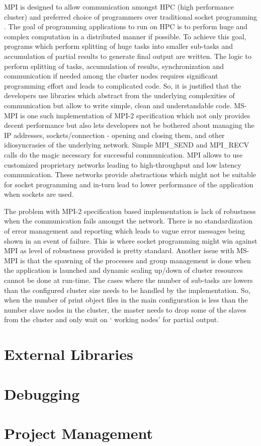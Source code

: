 MPI is designed to allow communication amongst HPC (high performance cluster) and preferred choice of programmers over traditional socket programming \cite{mpivssock}. The goal of programming applications to run on HPC is to perform huge and complex computation in a distributed manner if possible. To achieve this goal, programs which perform splitting of huge tasks into smaller sub-tasks and accumulation of partial results to generate final output are written. The logic to perform splitting of tasks, accumulation of results, synchronization and communication if needed among the cluster nodes requires significant programming effort and leads to complicated code. So, it is justified that the developers use libraries which abstract from the underlying complexities of communication but allow to write simple, clean and understandable code. MS-MPI is one such implementation of MPI-2 specification which not only provides decent performance but also lets developers not be bothered about managing the IP addresses, sockets/connection - opening and closing them, and other idiosyncrasies of the underlying network. Simple MPI\_SEND and MPI\_RECV calls do the magic necessary for successful communication. MPI allows to use customized proprietary networks leading to high-throughput and low latency communication. These networks provide abstractions which might not be suitable for socket programming and in-turn lead to lower performance of the application when sockets are used. \newline          

The problem with MPI-2 specification based implementation is lack of robustness when the communication fails amongst the network. There is no standardization of error management and reporting which leads to vague error messages being shown in an event of failure. This is where socket programming might win against MPI as level of robustness provided is pretty standard. Another issue with MS-MPI is that the spawning of the processes and group management is done when the application is launched and dynamic scaling up/down of cluster resources cannot be done at run-time. The cases where the number of sub-tasks are lowers than the configured cluster size needs to be handled by the implementation. So, when the number of print object files in the main configuration is less than the number slave nodes in the cluster, the master needs to drop some of the slaves from the cluster and only wait on {\lq} working nodes{\rq} for partial output. 
	
\section{External Libraries}
\section{Debugging}
\section{Project Management}